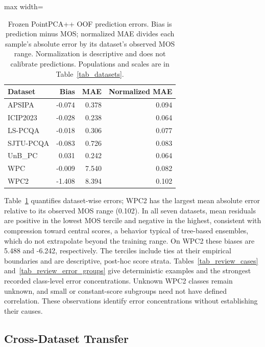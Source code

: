 \documentclass[final,3p,times,twocolumn]{elsarticle}
\begin{document}
\begin{table}[t!]
    \centering
    \caption{Frozen PointPCA++ \gls{OOF} prediction errors. Bias is prediction minus \gls{MOS}; normalized \gls{MAE} divides each sample's absolute error by its dataset's observed MOS range. Normalization is descriptive and does not calibrate predictions. Populations and scales are in Table~\ref{tab_datasets}.}
    \label{tab_review_error_summary}
    \scriptsize
    \begin{adjustbox}{max width=\textwidth}
        \begin{tabular}{lrrr}
        \toprule
        Dataset & Bias & MAE & Normalized MAE \\
        \midrule
        APSIPA & -0.074 & 0.378 & 0.094 \\
        ICIP2023 & -0.028 & 0.238 & 0.064 \\
        LS-PCQA & -0.018 & 0.306 & 0.077 \\
        SJTU-PCQA & -0.083 & 0.726 & 0.083 \\
        UnB\_PC & 0.031 & 0.242 & 0.064 \\
        WPC & -0.009 & 7.540 & 0.082 \\
        WPC2 & -1.408 & 8.394 & 0.102 \\
        \bottomrule
        \end{tabular}
    \end{adjustbox}
\end{table}


Table~\ref{tab_review_error_summary} quantifies dataset-wise errors; WPC2 has the largest mean absolute error relative to its observed MOS range (0.102). In all seven datasets, mean residuals are positive in the lowest MOS tercile and negative in the highest, consistent with compression toward central scores, a behavior typical of tree-based ensembles, which do not extrapolate beyond the training range. On WPC2 these biases are 5.488 and -6.242, respectively. The terciles include ties at their empirical boundaries and are descriptive, post-hoc score strata. Tables~\ref{tab_review_cases} and~\ref{tab_review_error_groups} give deterministic examples and the strongest recorded class-level error concentrations. Unknown WPC2 classes remain unknown, and small or constant-score subgroups need not have defined correlation. These observations identify error concentrations without establishing their causes.


\subsection{Cross-Dataset Transfer} \label{sec_results_transfer}
\end{document}
